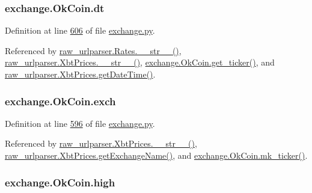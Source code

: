 \subsubsection[{\texorpdfstring{dt}{dt}}]{\setlength{\rightskip}{0pt plus 5cm}exchange.\+Ok\+Coin.\+dt}\hypertarget{classexchange_1_1_ok_coin_ade9d7cddcfa54f2b1ba5452854bfd48b}{}\label{classexchange_1_1_ok_coin_ade9d7cddcfa54f2b1ba5452854bfd48b}


Definition at line \hyperlink{exchange_8py_source_l00606}{606} of file \hyperlink{exchange_8py_source}{exchange.\+py}.



Referenced by \hyperlink{raw__urlparser_8py_source_l00038}{raw\+\_\+urlparser.\+Rates.\+\_\+\+\_\+str\+\_\+\+\_\+()}, \hyperlink{raw__urlparser_8py_source_l00074}{raw\+\_\+urlparser.\+Xbt\+Prices.\+\_\+\+\_\+str\+\_\+\+\_\+()}, \hyperlink{exchange_8py_source_l00608}{exchange.\+Ok\+Coin.\+get\+\_\+ticker()}, and \hyperlink{raw__urlparser_8py_source_l00059}{raw\+\_\+urlparser.\+Xbt\+Prices.\+get\+Date\+Time()}.

\subsubsection[{\texorpdfstring{exch}{exch}}]{\setlength{\rightskip}{0pt plus 5cm}exchange.\+Ok\+Coin.\+exch}\hypertarget{classexchange_1_1_ok_coin_a22678c192b53ddf34e8a636e0cdaf4d4}{}\label{classexchange_1_1_ok_coin_a22678c192b53ddf34e8a636e0cdaf4d4}


Definition at line \hyperlink{exchange_8py_source_l00596}{596} of file \hyperlink{exchange_8py_source}{exchange.\+py}.



Referenced by \hyperlink{raw__urlparser_8py_source_l00074}{raw\+\_\+urlparser.\+Xbt\+Prices.\+\_\+\+\_\+str\+\_\+\+\_\+()}, \hyperlink{raw__urlparser_8py_source_l00068}{raw\+\_\+urlparser.\+Xbt\+Prices.\+get\+Exchange\+Name()}, and \hyperlink{exchange_8py_source_l00622}{exchange.\+Ok\+Coin.\+mk\+\_\+ticker()}.

\subsubsection[{\texorpdfstring{high}{high}}]{\setlength{\rightskip}{0pt plus 5cm}exchange.\+Ok\+Coin.\+high}\hypertarget{classexchange_1_1_ok_coin_af9d9dbcfc86404510e7f9a5704e8eecd}{}\label{classexchange_1_1_ok_coin_af9d9dbcfc86404510e7f9a5704e8eecd}



